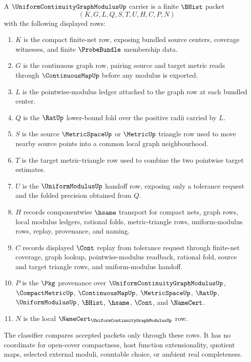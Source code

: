 \begin{definition}
\label{def:uniform-continuity-graph-modulus-carrier}
A $\UniformContinuityGraphModulusUp$ carrier is a finite $\BHist$ packet
$$
(K,G,L,Q,S,T,U,H,C,P,N)
$$
with the following displayed rows:
\begin{enumerate}
\item $K$ is the compact finite-net row, exposing bundled source centers, coverage witnesses, and finite $\ProbeBundle$ membership data.
\item $G$ is the continuous graph row, pairing source and target metric reads through $\ContinuousMapUp$ before any modulus is exported.
\item $L$ is the pointwise-modulus ledger attached to the graph row at each bundled center.
\item $Q$ is the $\RatUp$ lower-bound fold over the positive radii carried by $L$.
\item $S$ is the source $\MetricSpaceUp$ or $\MetricUp$ triangle row used to move nearby source points into a common local graph neighbourhood.
\item $T$ is the target metric-triangle row used to combine the two pointwise target estimates.
\item $U$ is the $\UniformModulusUp$ handoff row, exposing only a tolerance request and the folded precision obtained from $Q$.
\item $H$ records componentwise $\hsame$ transport for compact nets, graph rows, local modulus ledgers, rational folds, metric-triangle rows, uniform-modulus rows, replay, provenance, and naming.
\item $C$ records displayed $\Cont$ replay from tolerance request through finite-net coverage, graph lookup, pointwise-modulus readback, rational fold, source and target triangle rows, and uniform-modulus handoff.
\item $P$ is the $\Pkg$ provenance over $\UniformContinuityGraphModulusUp$, $\CompactMetricUp$, $\ContinuousMapUp$, $\MetricSpaceUp$, $\RatUp$, $\UniformModulusUp$, $\BHist$, $\hsame$, $\Cont$, and $\NameCert$.
\item $N$ is the local $\NameCert_{\UniformContinuityGraphModulusUp}$ row.
\end{enumerate}
The classifier compares accepted packets only through these rows. It has no coordinate for open-cover compactness, host function extensionality, quotient maps, selected external moduli, countable choice, or ambient real completeness.
\end{definition}

